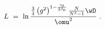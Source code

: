 \begin{equation}\label{e1bis}
L ~=~
\ln\frac{\frac{3}{4}\left(g^{2}\right)^{1-\frac{\gamma_{0}}{2\beta_{0}}}
\frac{N}{N^{2}-1}\wD}{\omu^{2}} ~.
\end{equation}

